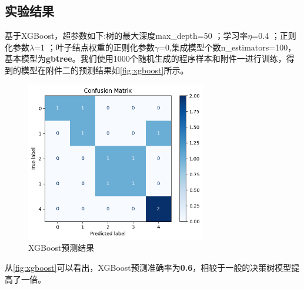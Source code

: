 \subsection{实验结果}
基于XGBoost，超参数如下:树的最大深度max\_depth=50 ；学习率$\eta$=0.4 ；正则化参数$\lambda$=1 ；叶子结点权重的正则化参数$\gamma$=0,集成模型个数n\_estimators=100，基本模型为\textbf{gbtree}。我们使用1000个随机生成的程序样本和附件一进行训练，得到的模型在附件二的预测结果如\autoref{fig:xgboost}所示。
\begin{figure}[H]
	\centering
	\includegraphics[width=0.7\textwidth]{figures/new_corr.png}
	\caption{XGBoost预测结果}
	\label{fig:xgboost}
\end{figure}
从\autoref{fig:xgboost}可以看出，XGBoost预测准确率为\textbf{0.6}，相较于一般的决策树模型提高了一倍。